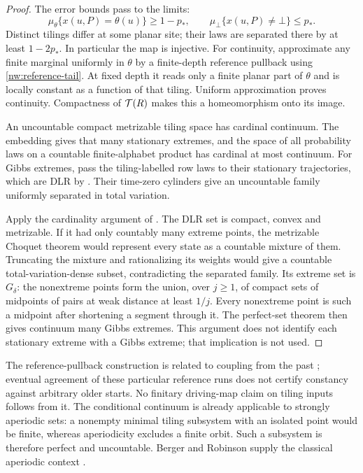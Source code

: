\begin{proof}
The error bounds pass to the limits:
\[
 \mu_\theta\{x(u,P)=\theta(u)\}\ge1-p_*,
 \qquad \mu_\bot\{x(u,P)\ne\bot\}\le p_*.
\]
Distinct tilings differ at some planar site; their laws are separated there by at least $1-2p_*$. In particular the map is injective. For continuity, approximate any finite marginal uniformly in $\theta$ by a finite-depth reference pullback using \eqref{nw:reference-tail}. At fixed depth it reads only a finite planar part of $\theta$ and is locally constant as a function of that tiling. Uniform approximation proves continuity. Compactness of $\mathcal T(R)$ makes this a homeomorphism onto its image.

An uncountable compact metrizable tiling space has cardinal continuum. The embedding gives that many stationary extremes, and the space of all probability laws on a countable finite-alphabet product has cardinal at most continuum. For Gibbs extremes, pass the tiling-labelled row laws to their stationary trajectories, which are DLR by \cite[Lemma~2.4]{DM26}. Their time-zero cylinders give an uncountable family uniformly separated in total variation.

Apply the cardinality argument of \cite[Theorem~9.6]{DMdiagram}. The DLR set is compact, convex and metrizable. If it had only countably many extreme points, the metrizable Choquet theorem \cite{Choquet} would represent every state as a countable mixture of them. Truncating the mixture and rationalizing its weights would give a countable total-variation-dense subset, contradicting the separated family. Its extreme set is $G_\delta$: the nonextreme points form the union, over $j\ge1$, of compact sets of midpoints of pairs at weak distance at least $1/j$. Every nonextreme point is such a midpoint after shortening a segment through it. The perfect-set theorem \cite{Kechris} then gives continuum many Gibbs extremes. This argument does not identify each stationary extreme with a Gibbs extreme; that implication is not used.
\end{proof}

The reference-pullback construction is related to coupling from the past \cite{PW96,vdBS99}; eventual agreement of these particular reference runs does not certify constancy against arbitrary older starts. No finitary driving-map claim on tiling inputs follows from it. The conditional continuum is already applicable to strongly aperiodic sets: a nonempty minimal tiling subsystem with an isolated point would be finite, whereas aperiodicity excludes a finite orbit. Such a subsystem is therefore perfect and uncountable. Berger and Robinson supply the classical aperiodic context \cite{Berger66,Robinson71}.

